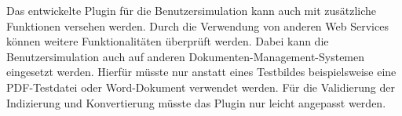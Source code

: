 Das entwickelte Plugin für die Benutzersimulation kann auch mit zusätzliche Funktionen versehen werden.
Durch die Verwendung von anderen Web Services können weitere Funktionalitäten überprüft werden.
Dabei kann die Benutzersimulation auch auf anderen Dokumenten-Management-Systemen eingesetzt werden.
Hierfür müsste nur anstatt eines Testbildes beispielsweise eine \gls{PDF}-Testdatei oder Word-Dokument verwendet werden.
Für die Validierung der Indizierung und Konvertierung müsste das Plugin nur leicht angepasst werden.


%
%
%
%
